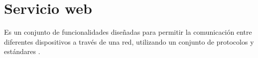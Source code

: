 \section{Servicio web} \label{Servicio web}

Es un conjunto de funcionalidades diseñadas para permitir la comunicación entre diferentes dispositivos a través de una red, utilizando un conjunto de protocolos y estándares \cite{WBS0}.